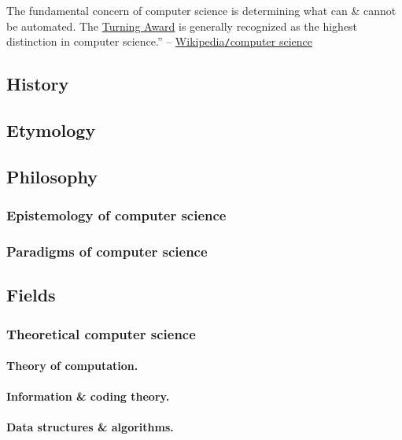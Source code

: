 \documentclass[oneside]{book}
\numberwithin{equation}{section}
\begin{document}
The fundamental concern of computer science is determining what can \& cannot be automated. The \href{https://en.wikipedia.org/wiki/Turing_Award}{Turning Award} is generally recognized as the highest distinction in computer science.'' -- \href{https://en.wikipedia.org/wiki/Computer_science}{Wikipedia\texttt{/}computer science}

\subsection{History}

\subsection{Etymology}

\subsection{Philosophy}

\subsubsection{Epistemology of computer science}

\subsubsection{Paradigms of computer science}

\subsection{Fields}

\subsubsection{Theoretical computer science}

\paragraph{Theory of computation.}

\paragraph{Information \& coding theory.}

\paragraph{Data structures \& algorithms.}
\end{document}
